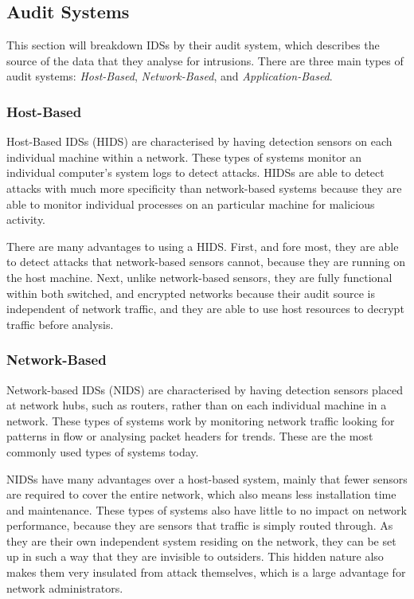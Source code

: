 \documentclass{acm_proc_article-sp}
\begin{document}
    \subsection{Audit Systems}
    	This section will breakdown IDSs by their audit system, which describes the source of the data that they analyse for intrusions. There are three main types of audit systems: \emph{Host-Based}, \emph{Network-Based}, and \emph{Application-Based}.
    	\subsubsection{Host-Based}
    		Host-Based IDSs (HIDS) are characterised by having detection sensors on each individual machine within a network. These types of systems monitor an individual computer's system logs to detect attacks. HIDSs are able to detect attacks with much more specificity than network-based systems because they are able to monitor individual processes on an particular machine for malicious activity. 
    		
    		There are many advantages to using a HIDS. First, and fore most, they are able to detect attacks that network-based sensors cannot, because they are running on the host machine. Next, unlike network-based sensors, they are fully functional within both switched, and encrypted networks because their audit source is independent of network traffic, and they are able to use host resources to decrypt traffic before analysis.
    		
    		
    	\subsubsection{Network-Based}
    		Network-based IDSs (NIDS) are characterised by having detection sensors placed at network hubs, such as routers, rather than on each individual machine in a network. These types of systems work by monitoring network traffic looking for patterns in flow or analysing packet headers for trends. These are the most commonly used types of systems today. 
    		
    		NIDSs have many advantages over a host-based system, mainly that fewer sensors are required to cover the entire network, which also means less installation time and maintenance. These types of systems also have little to no impact on network performance, because they are sensors that traffic is simply routed through. As they are their own independent system residing on the network, they can be set up in such a way that they are invisible to outsiders. This hidden nature also makes them very insulated from attack themselves, which is a large advantage for network administrators. 
    		
\end{document}
